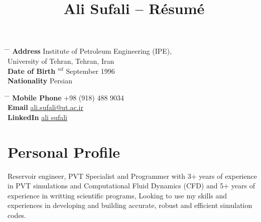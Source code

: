 \documentclass[10pt]{article} %
\begin{document}

\title{Ali Sufali -- Résumé} %


\parbox{0.5\textwidth}{ %
\begin{tabbing} %
\hspace{3cm} \= \hspace{4cm} \= \kill %
{\bf Address} \> Institute of Petroleum Engineering (IPE), \\ %
\> University of Tehran, Tehran, Iran \\ %
{\bf Date of Birth} $^{nd}$ September 1996 \\ %
{\bf Nationality} \> Persian %
\end{tabbing}}
\hfill %
\parbox{0.5\textwidth}{ %
\begin{tabbing} %
\hspace{3cm} \= \hspace{4cm} \= \kill %
{\bf Mobile Phone} \> +98 (918) 488 9034 \\ %
{\bf Email} \> \href{mailto:ali.sufali@ut.ac.ir}{ali.sufali@ut.ac.ir} \\ %
{\bf LinkedIn} \> \href{https://www.linkedin.com/in/ali-sufali/}{ali sufali}
\end{tabbing}}



\section{Personal Profile}

Reservoir engineer, PVT Specialist and Programmer with 3+ years of experience in PVT simulations and Computational Fluid Dynamics (CFD) and 5+ years of experience in writting scientific programs, Looking to use my skills and experiences in developing and building accurate, robust and efficient simulation codes.
\end{document}
